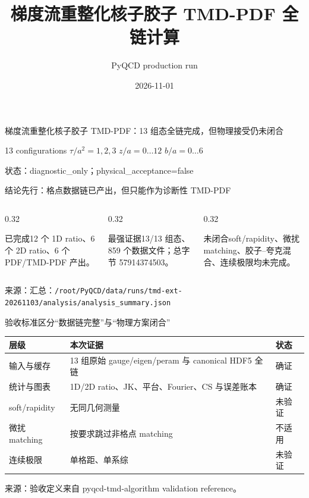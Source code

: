 \documentclass[UTF8,aspectratio=169,11pt]{ctexbeamer}
\title[PyQCD TMD]{梯度流重整化核子胶子 TMD-PDF 全链计算}
\author[PyQCD]{PyQCD production run}
\date{2026-11-01}
\newcommand{\source}[1]{\vspace{0.06em}\par{\raggedright\scriptsize\color{muted}来源：#1\par}}
\begin{document}
\begin{frame}[plain]{梯度流重整化核子胶子 TMD-PDF：13 组态全链完成，但物理接受仍未闭合}
  \centering\begin{minipage}{0.86\linewidth}\par\vspace{0.7em}13 configurations \quad $\tau/a^2=1,2,3$ \quad $z/a=0\ldots12$ \quad $b/a=0\ldots6$\par\vspace{1em}\textcolor{warning}{状态：diagnostic\_only；physical\_acceptance=false}\end{minipage}

\end{frame}

\begin{frame}[t]{结论先行：格点数据链已产出，但只能作为诊断性 TMD-PDF}
  \begin{columns}[T,totalwidth=\textwidth]
\begin{column}{0.32\textwidth}\begin{block}{已完成}12 个 1D ratio、6 个 2D ratio、6 个 PDF/TMD-PDF 产出。\end{block}\end{column}
\begin{column}{0.32\textwidth}\begin{block}{最强证据}13/13 组态、859 个数据文件；总字节 57914374503。\end{block}\end{column}
\begin{column}{0.32\textwidth}\begin{block}{未闭合}soft/rapidity、微扰 matching、胶子--夸克混合、连续极限均未完成。\end{block}\end{column}\end{columns}

  \source{汇总：\nolinkurl{/root/PyQCD/data/runs/tmd-ext-20261103/analysis/analysis_summary.json}}
\end{frame}

\begin{frame}[t]{验收标准区分“数据链完整”与“物理方案闭合”}
  \small\begin{tabularx}{\linewidth}{@{}l X l@{}}\toprule 层级 & 本次证据 & 状态 \\ \midrule 输入与缓存 & 13 组原始 gauge/eigen/peram 与 canonical HDF5 全链 & 确证 \\ 统计与图表 & 1D/2D ratio、JK、平台、Fourier、CS 与误差账本 & 确证 \\ soft/rapidity & 无同几何测量 & 未验证 \\ 微扰 matching & 按要求跳过非格点 matching & 不适用 \\ 连续极限 & 单格距、单系综 & 未验证 \\ \bottomrule\end{tabularx}

  \source{验收定义来自 pyqcd-tmd-algorithm validation reference。}
\end{frame}
\end{document}
